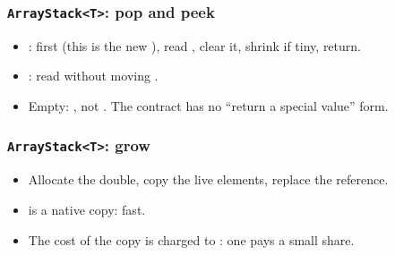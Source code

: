 \documentclass[aspectratio=169,10pt,compress]{beamer}
\begin{document}
\begin{frame}[t,fragile] \frametitle{\texttt{ArrayStack<T>}: pop and peek}
  \begin{itemize}\small
    \item {}:  first (this is the new ),
          read , clear it, shrink if tiny, return.
    \item {}: read without moving .
    \item Empty: , not .
          The contract has no ``return a special value'' form.
  \end{itemize}
\end{frame}




\begin{frame}[t,fragile] \frametitle{\texttt{ArrayStack<T>}: grow}
  \begin{itemize}\small
    \item Allocate the double, copy the  live elements,
          replace the reference.
    \item {} is a native copy: fast.
    \item The cost of the copy is charged to : one
           pays a small share.
  \end{itemize}
\end{frame}
\end{document}

